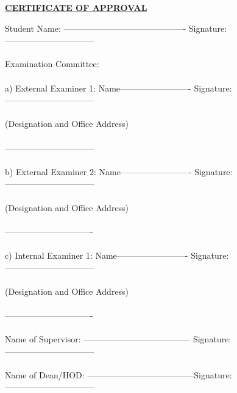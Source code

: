 \documentclass{article}
\begin{document}
\NoBgThispage
\newpage
{}
	\thispagestyle{empty}
\begin{center}
\textbf{\underline {CERTIFICATE OF APPROVAL}}
\end{center}
\begin{justify}
\end{justify}
Student Name: -------------------------------------------  
    Signature: -------------------------------- \\~\\			Examination Committee:\\~\\
    a)  External Examiner 1: Name-------------------------	      
      Signature:-------------------------------- \\~\\			
	(Designation and Office Address)\\~\\
--------------------------------\\~\\
b)  External Examiner 2: Name-------------------------	Signature:-------------------------------- 	\\	~\\	
	(Designation and Office Address)\\~\\
-------------------------------\\~\\
c)  Internal Examiner 1: Name-------------------------	Signature:-------------------------------- 	\\	~\\	
	(Designation and Office Address)\\~\\
-------------------------------\\~\\
Name of Supervisor: -------------------------------------- 	Signature:--------------------------------\\	~\\		
Name of Dean/HOD: --------------------------------------Signature:--------------------------------			
								
\end{document}
